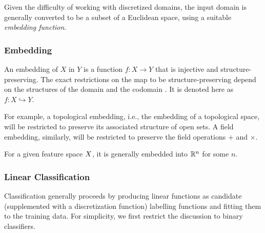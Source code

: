Given the difficulty of working with discretized domains, the input domain is
generally converted to be a subset of a Euclidean space, using a suitable
\emph{embedding function}.

\subsubsection{Embedding}
An embedding of \(X\) in \(Y\) is a function \(f:X \to Y\) that is injective and
structure-preserving. The exact restrictions on the map to be
structure-preserving depend on the structures of the domain and the codomain
\cite{sankappanavar1981course}. It is denoted here as \(f:X\hookrightarrow Y\).

For example, a topological embedding, i.e., the embedding of a topological
space, will be restricted to preserve its associated structure of open sets. A
field embedding, similarly, will be restricted to preserve the field operations
\(+\) and \(\times\).

For a given feature space \(X\), it is generally embedded into
\(\mathbb{R}^n\) for some \(n\).

\subsubsection{Linear Classification}
Classification generally proceeds by producing linear functions as candidate
(supplemented with a discretization function) labelling functions and fitting
them to the training data. For simplicity, we first restrict the discussion to
binary classifiers.

